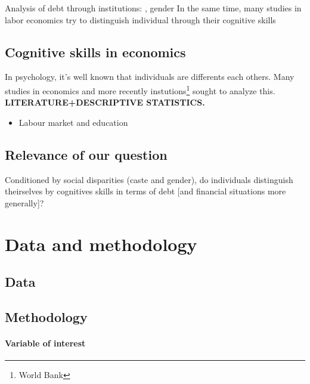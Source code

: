 \documentclass[a4paper, 11pt, onecolumn]{article}
\begin{document}
	Analysis of debt through institutions: \jati, gender
	In the same time, many studies in labor economics try to distinguish individual through their cognitive skills
	
	\subsection{Cognitive skills in economics}
	
	In psychology, it's well known that individuals are differents each others.
	Many studies in economics and more recently instutions\footnote{World Bank} sought to analyze this.
	\textbf{LITERATURE+DESCRIPTIVE STATISTICS.}
	\begin{itemize}
	\item Labour market and education \cite{Almlund2011}
	\end{itemize}
	

\subsection*{Relevance of our question}
Conditioned by social disparities (caste and gender), do individuals distinguish theirselves by cognitives skills in terms of debt [and financial situations more generally]?




\newpage
\section{Data and methodology}


	\subsection{Data}



	\subsection{Methodology}

\paragraph{Variable of interest}
\end{document}
